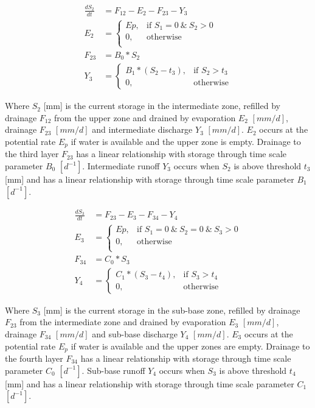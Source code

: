 \begin{align}
	\frac{dS_2}{dt} &= F_{12}-E_2-F_{23}-Y_3\\
	E_2 &= \begin{cases}
		Ep, &\text{if } S_1 = 0 ~\&~ S_2 > 0\\
		0, & \text{otherwise} \\
	\end{cases} \\
	F_{23} &= B_0*S_2\\
	Y_3 &= 
	\begin{cases}
		B_1*(S_2-t_3), & \text{if } S_2 > t_3 \\
		0, & \text{otherwise}
	\end{cases}
\end{align}

Where $S_2$ [mm] is the current storage in the intermediate zone, refilled by drainage $F_{12}$ from the upper zone and drained by evaporation $E_2$ $[mm/d]$, drainage $F_{23}$ $[mm/d]$ and intermediate discharge $Y_3$ $[mm/d]$. $E_2$ occurs at the potential rate $E_p$ if water is available and the upper zone is empty. Drainage to the third layer $F_{23}$ has a linear relationship with storage through time scale parameter $B_0$ $[d^{-1}]$. Intermediate runoff $Y_3$ occurs when $S_2$ is above threshold $t_3$ [mm] and has a linear relationship with storage through time scale parameter $B_1$ $[d^{-1}]$.

\begin{align}
	\frac{dS_3}{dt} &= F_{23}-E_3-F_{34}-Y_4\\
	E_3 &= \begin{cases}
		Ep, &\text{if } S_1 = 0 ~\&~ S_2 = 0 ~\&~ S_3 > 0\\
		0, & \text{otherwise} \\
	\end{cases} \\
	F_{34} &= C_0*S_3\\
	Y_4 &= 
	\begin{cases}
		C_1*(S_3-t_4), & \text{if } S_3 > t_4 \\
		0, & \text{otherwise}
	\end{cases}
\end{align}

Where $S_3$ [mm] is the current storage in the sub-base zone, refilled by drainage $F_{23}$ from the intermediate zone and drained by evaporation $E_3$ $[mm/d]$, drainage $F_{34}$ $[mm/d]$ and sub-base discharge $Y_4$ $[mm/d]$. $E_3$ occurs at the potential rate $E_p$ if water is available and the upper zones are empty. Drainage to the fourth layer $F_{34}$ has a linear relationship with storage through time scale parameter $C_0$ $[d^{-1}]$. Sub-base runoff $Y_4$ occurs when $S_3$ is above threshold $t_4$ [mm] and has a linear relationship with storage through time scale parameter $C_1$ $[d^{-1}]$.

